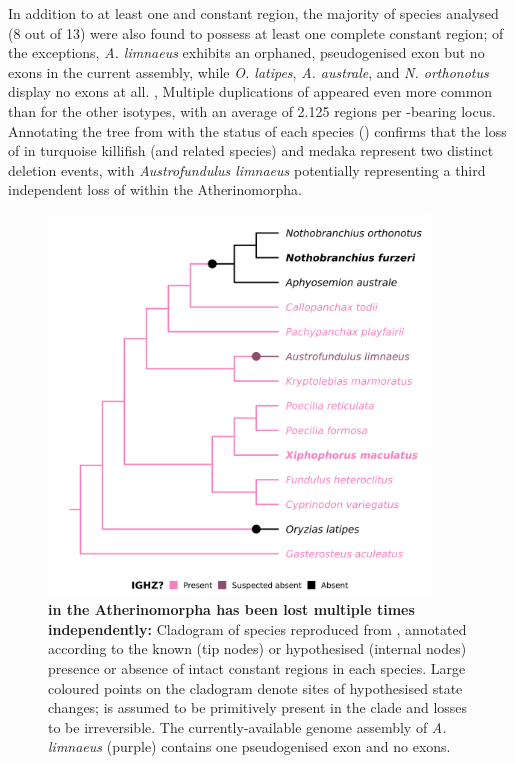 In addition to at least one  and  constant region, the majority of species analysed (8 out of 13) were also found to possess at least one complete  constant region; of the exceptions, \textit{A. limnaeus} exhibits an orphaned, pseudogenised  exon but no \cz exons in the current assembly, while \textit{O. latipes}, \textit{A. australe}, \Nfu and \textit{N. orthonotus} display no  exons at all. , Multiple duplications of  appeared even more common than for the other isotypes, with an average of 2.125 regions per -bearing locus. Annotating the tree from  with the  status of each species () confirms that the loss of  in turquoise killifish (and related species) and medaka represent two distinct deletion events, with \textit{Austrofundulus limnaeus} potentially representing a third independent loss of  within the Atherinomorpha.

\begin{figure}
\centering
\includegraphics[width=0.9\textwidth]{_Figures/png/species-tree-large-ighz}
\caption[ in the Atherinomorpha has been lost multiple times independently]{\textbf{ in the Atherinomorpha has been lost multiple times independently:} Cladogram of species reproduced from , annotated according to the known (tip nodes) or hypothesised (internal nodes) presence or absence of intact  constant regions in each species. Large coloured points on the cladogram denote sites of hypothesised state changes;  is assumed to be primitively present in the clade and losses to be irreversible. The currently-available genome assembly of \textit{A. limnaeus} (purple) contains one pseudogenised  exon and no \cz{} exons.}
\label{fig:species-tree-large-ighz}
\end{figure}

